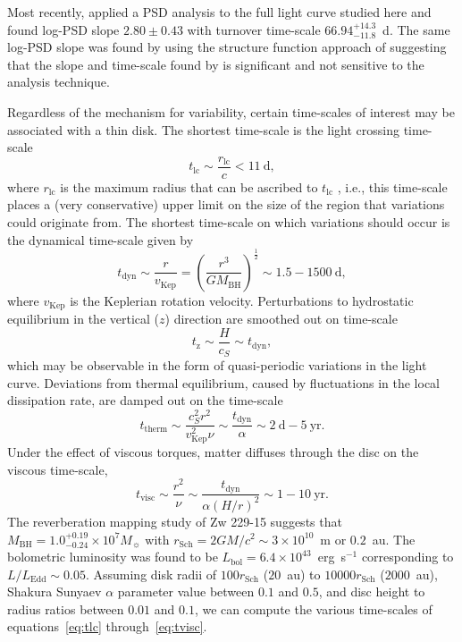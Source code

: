 \documentclass[a4paper,fleqn,usenatbib]{mnras}
\begin{document}
Most recently, \citet{CariniWilliamsAAS} applied a PSD analysis to the full light curve studied here and found log-PSD slope $2.80 \pm 0.43$ with turnover time-scale $66.94^{+14.3}_{-11.8}$~d. The same log-PSD slope was found by \citet{Kasliwal15b} using the structure function approach of \citet{Kasliwal15} suggesting that the slope and time-scale found by \citet{CariniWilliamsAAS} is significant and not sensitive to the analysis technique.

Regardless of the mechanism for variability, certain time-scales of interest may be associated with a thin disk. The shortest time-scale is the light crossing time-scale
\begin{equation}\label{eq:tlc}
t_{\mathrm{lc}} \sim \frac{r_{\mathrm{lc}}}{c} < 11~\text{d},
\end{equation}
where $r_{\mathrm{lc}}$ is the maximum radius that can be ascribed to $t_{\mathrm{lc}}$ \citep{Peterson}, i.e., this time-scale places a (very conservative) upper limit on the size of the region that variations could originate from. The shortest time-scale on which variations should occur is the dynamical time-scale given by
\begin{equation}\label{eq:tdyn}
t_{\mathrm{dyn}} \sim \frac{r}{v_{\mathrm{Kep}}} = \left( \frac{r^{3}}{GM_{\mathrm{BH}}} \right)^{\frac{1}{2}} \sim 1.5 - 1500~\text{d},
\end{equation}
where $v_{\mathrm{Kep}}$ is the Keplerian rotation velocity. Perturbations to hydrostatic equilibrium in the vertical ($z$) direction are smoothed out on time-scale
\begin{equation}\label{eq:tz}
t_{\mathrm{z}} \sim \frac{H}{c_{S}} \sim t_{\mathrm{dyn}},
\end{equation}
which may be observable in the form of quasi-periodic variations in the light curve. Deviations from thermal equilibrium, caused by fluctuations in the local dissipation rate, are damped out on the time-scale
\begin{equation}\label{eq:ttherm}
t_{\mathrm{therm}} \sim \frac{c_{S}^{2}r^{2}}{v_{\mathrm{Kep}}^{2} \nu} \sim \frac{t_{\mathrm{dyn}}}{\alpha}  \sim 2~\text{d} - 5~\text{yr}.
\end{equation}
Under the effect of viscous torques, matter diffuses through the disc on the viscous time-scale,  
\begin{equation}\label{eq:tvisc}
t_{\mathrm{visc}} \sim \frac{r^{2}}{\nu} \sim \frac{t_{\mathrm{dyn}}}{\alpha (H/r)^{2}} \sim 1 - 10~\text{yr}.
\end{equation}
The \citet{Barth11} reverberation mapping study of Zw 229-15 suggests that $M_{\mathrm{BH}} = 1.0^{+0.19}_{-0.24} \times 10^{7} M_{\sun}$ with $r_{\mathrm{Sch}} = 2GM/c^{2} \sim 3 \times 10^{10}$~m or $0.2$~au. The bolometric luminosity was found to be $L_{\mathrm{bol}} = 6.4 \times 10^{43}$~erg~s$^{-1}$ corresponding to $L / L_{\mathrm{Edd}} \sim 0.05$. Assuming disk radii of $100 r_{\mathrm{Sch}}$ ($20$~au) to $10000 r_{\mathrm{{Sch}}}$ ($2000$~au), Shakura Sunyaev $\alpha$ parameter value between $0.1$ and $0.5$, and disc height to radius ratios between $0.01$ and $0.1$, we can compute the various time-scales of equations~\eqref{eq:tlc} through~\eqref{eq:tvisc}. 
\end{document}
